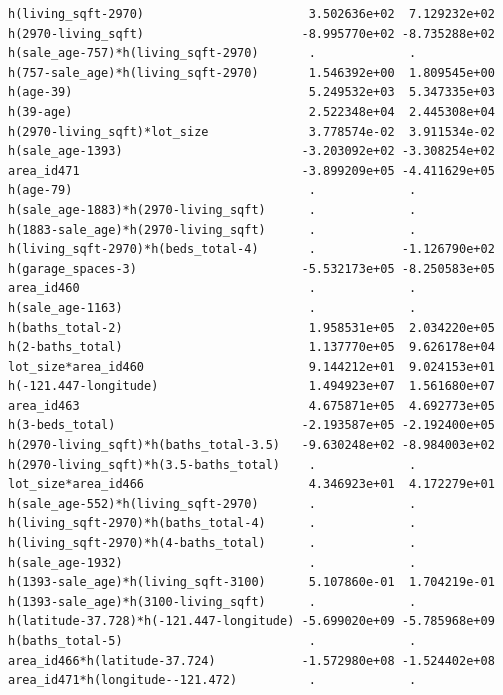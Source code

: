 \documentclass[
]{article}
\begin{document}
\begin{verbatim}
h(living_sqft-2970)                       3.502636e+02  7.129232e+02
h(2970-living_sqft)                      -8.995770e+02 -8.735288e+02
h(sale_age-757)*h(living_sqft-2970)       .             .           
h(757-sale_age)*h(living_sqft-2970)       1.546392e+00  1.809545e+00
h(age-39)                                 5.249532e+03  5.347335e+03
h(39-age)                                 2.522348e+04  2.445308e+04
h(2970-living_sqft)*lot_size              3.778574e-02  3.911534e-02
h(sale_age-1393)                         -3.203092e+02 -3.308254e+02
area_id471                               -3.899209e+05 -4.411629e+05
h(age-79)                                 .             .           
h(sale_age-1883)*h(2970-living_sqft)      .             .           
h(1883-sale_age)*h(2970-living_sqft)      .             .           
h(living_sqft-2970)*h(beds_total-4)       .            -1.126790e+02
h(garage_spaces-3)                       -5.532173e+05 -8.250583e+05
area_id460                                .             .           
h(sale_age-1163)                          .             .           
h(baths_total-2)                          1.958531e+05  2.034220e+05
h(2-baths_total)                          1.137770e+05  9.626178e+04
lot_size*area_id460                       9.144212e+01  9.024153e+01
h(-121.447-longitude)                     1.494923e+07  1.561680e+07
area_id463                                4.675871e+05  4.692773e+05
h(3-beds_total)                          -2.193587e+05 -2.192400e+05
h(2970-living_sqft)*h(baths_total-3.5)   -9.630248e+02 -8.984003e+02
h(2970-living_sqft)*h(3.5-baths_total)    .             .           
lot_size*area_id466                       4.346923e+01  4.172279e+01
h(sale_age-552)*h(living_sqft-2970)       .             .           
h(living_sqft-2970)*h(baths_total-4)      .             .           
h(living_sqft-2970)*h(4-baths_total)      .             .           
h(sale_age-1932)                          .             .           
h(1393-sale_age)*h(living_sqft-3100)      5.107860e-01  1.704219e-01
h(1393-sale_age)*h(3100-living_sqft)      .             .           
h(latitude-37.728)*h(-121.447-longitude) -5.699020e+09 -5.785968e+09
h(baths_total-5)                          .             .           
area_id466*h(latitude-37.724)            -1.572980e+08 -1.524402e+08
area_id471*h(longitude--121.472)          .             .           
                                                                    

\end{verbatim}
\end{document}
